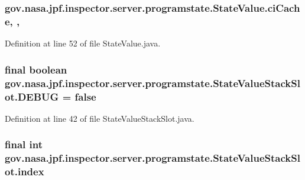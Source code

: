 \subsubsection[{\texorpdfstring{ci\+Cache}{ciCache}}]{ gov.\+nasa.\+jpf.\+inspector.\+server.\+programstate.\+State\+Value.\+ci\+Cache\hspace{0.3cm}{\ttfamily [static]}, {\ttfamily [package]}, {\ttfamily [inherited]}}\hypertarget{classgov_1_1nasa_1_1jpf_1_1inspector_1_1server_1_1programstate_1_1_state_value_a38182b5018580765f3f2cdc9e96e1ca2}{}\label{classgov_1_1nasa_1_1jpf_1_1inspector_1_1server_1_1programstate_1_1_state_value_a38182b5018580765f3f2cdc9e96e1ca2}


Definition at line 52 of file State\+Value.\+java.

\subsubsection[{\texorpdfstring{D\+E\+B\+UG}{DEBUG}}]{\setlength{\rightskip}{0pt plus 5cm}final boolean gov.\+nasa.\+jpf.\+inspector.\+server.\+programstate.\+State\+Value\+Stack\+Slot.\+D\+E\+B\+UG = false\hspace{0.3cm}{\ttfamily [static]}}\hypertarget{classgov_1_1nasa_1_1jpf_1_1inspector_1_1server_1_1programstate_1_1_state_value_stack_slot_a534b308e096f779c363e5970565f4e1a}{}\label{classgov_1_1nasa_1_1jpf_1_1inspector_1_1server_1_1programstate_1_1_state_value_stack_slot_a534b308e096f779c363e5970565f4e1a}


Definition at line 42 of file State\+Value\+Stack\+Slot.\+java.

\subsubsection[{\texorpdfstring{index}{index}}]{\setlength{\rightskip}{0pt plus 5cm}final int gov.\+nasa.\+jpf.\+inspector.\+server.\+programstate.\+State\+Value\+Stack\+Slot.\+index\hspace{0.3cm}{\ttfamily [private]}}\hypertarget{classgov_1_1nasa_1_1jpf_1_1inspector_1_1server_1_1programstate_1_1_state_value_stack_slot_aaa652f9cedf942095d9f6966cc2ebe3d}{}\label{classgov_1_1nasa_1_1jpf_1_1inspector_1_1server_1_1programstate_1_1_state_value_stack_slot_aaa652f9cedf942095d9f6966cc2ebe3d}


